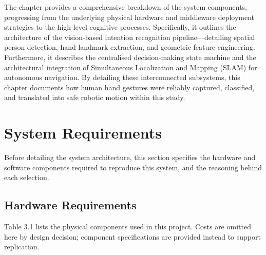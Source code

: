 The chapter provides a comprehensive breakdown of the system components, progressing from the underlying physical hardware and middleware deployment strategies to the high-level cognitive processes. Specifically, it outlines the architecture of the vision-based intention recognition pipeline—detailing spatial person detection, hand landmark extraction, and geometric feature engineering. Furthermore, it describes the centralised decision-making state machine and the architectural integration of Simultaneous Localization and Mapping (SLAM) for autonomous navigation. By detailing these interconnected subsystems, this chapter documents how human hand gestures were reliably captured, classified, and translated into safe robotic motion within this study.

\section{System Requirements}

Before detailing the system architecture, this section specifies the hardware and
software components required to reproduce this system, and the reasoning behind each
selection.

\subsection{Hardware Requirements}

Table 3.1 lists the physical components used in this project. Costs are omitted here
by design decision; component specifications are provided instead to support
replication.

